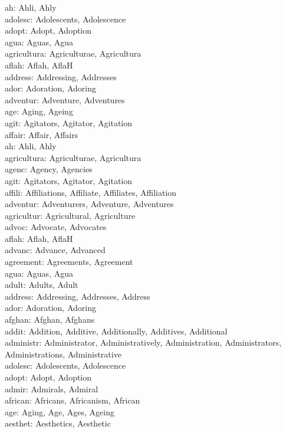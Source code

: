 \noindent
ah: Ahli, Ahly\\
adolesc: Adolescents, Adolescence\\
adopt: Adopt, Adoption\\
agua: Aguas, Agua\\
agricultura: Agriculturae, Agricultura\\
aflah: Aflah, AflaH\\
address: Addressing, Addresses\\
ador: Adoration, Adoring\\
adventur: Adventure, Adventures\\
age: Aging, Ageing\\
agit: Agitators, Agitator, Agitation\\



\noindent
affair: Affair, Affairs\\
ah: Ahli, Ahly\\
agricultura: Agriculturae, Agricultura\\
agenc: Agency, Agencies\\
agit: Agitators, Agitator, Agitation\\
affili: Affiliations, Affiliate, Affiliates, Affiliation\\
adventur: Adventurers, Adventure, Adventures\\
agricultur: Agricultural, Agriculture\\
advoc: Advocate, Advocates\\
aflah: Aflah, AflaH\\
advanc: Advance, Advanced\\
agreement: Agreements, Agreement\\
agua: Aguas, Agua\\
adult: Adults, Adult\\
address: Addressing, Addresses, Address\\
ador: Adoration, Adoring\\
afghan: Afghan, Afghans\\
addit: Addition, Additive, Additionally, Additives, Additional\\
administr: Administrator, Administratively, Administration, Administrators, Administrations, Administrative\\
adolesc: Adolescents, Adolescence\\
adopt: Adopt, Adoption\\
admir: Admirals, Admiral\\
african: Africans, Africanism, African\\
age: Aging, Age, Ages, Ageing\\
aesthet: Aesthetics, Aesthetic\\
